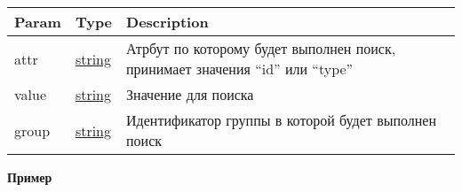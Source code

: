 \begin{longtable}[]{@{}lll@{}}
\toprule
\begin{minipage}[b]{0.30\columnwidth}\raggedright
Param\strut
\end{minipage} & \begin{minipage}[b]{0.30\columnwidth}\raggedright
Type\strut
\end{minipage} & \begin{minipage}[b]{0.30\columnwidth}\raggedright
Description\strut
\end{minipage}\tabularnewline
\midrule
\endhead
\begin{minipage}[t]{0.30\columnwidth}\raggedright
attr\strut
\end{minipage} & \begin{minipage}[t]{0.30\columnwidth}\raggedright
\protect\hyperlink{string}{string}\strut
\end{minipage} & \begin{minipage}[t]{0.30\columnwidth}\raggedright
Атрбут по которому будет выполнен поиск, принимает значения ``id'' или
``type''\strut
\end{minipage}\tabularnewline
\begin{minipage}[t]{0.30\columnwidth}\raggedright
value\strut
\end{minipage} & \begin{minipage}[t]{0.30\columnwidth}\raggedright
\protect\hyperlink{string}{string}\strut
\end{minipage} & \begin{minipage}[t]{0.30\columnwidth}\raggedright
Значение для поиска\strut
\end{minipage}\tabularnewline
\begin{minipage}[t]{0.30\columnwidth}\raggedright
group\strut
\end{minipage} & \begin{minipage}[t]{0.30\columnwidth}\raggedright
\protect\hyperlink{string}{string}\strut
\end{minipage} & \begin{minipage}[t]{0.30\columnwidth}\raggedright
Идентификатор группы в которой будет выполнен поиск\strut
\end{minipage}\tabularnewline
\bottomrule
\end{longtable}

\textbf{Пример}

